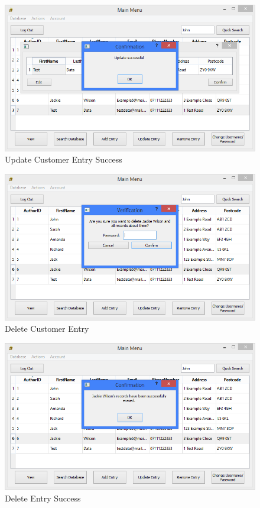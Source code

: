 \begin{figure}[H]
    \caption{Update Customer Entry Success} \label{fig:UpdateEntrySuccess}
    \includegraphics[width=\textwidth]{./Maintenance/UserInterface/UpdateEntrySuccess.png}
\end{figure}

\begin{figure}[H]
    \caption{Delete Customer Entry} \label{fig:DeleteEntry}
    \includegraphics[width=\textwidth]{./Maintenance/UserInterface/DeleteEntry.png}
\end{figure}

\begin{figure}[H]
    \caption{Delete Entry Success} \label{fig:DeleteEntrySuccess}
    \includegraphics[width=\textwidth]{./Maintenance/UserInterface/DeleteEntrySuccess.png}
\end{figure}

